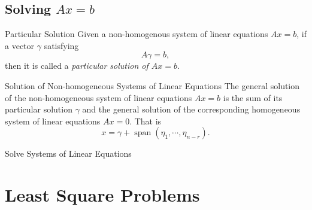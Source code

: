 \subsection{Solving $Ax = b$}

\begin{definition}{Particular Solution}{}
  Given a non-homogenous system of linear equations $Ax = b$,
  if a vector $\gamma$ satisfying 
  \begin{equation}
    A \gamma = b,
  \end{equation}
  then it is called a \emph{particular solution of $Ax = b$}.
\end{definition}

\begin{proposition}{Solution of Non-homogeneous Systems of Linear Equations}{}
  The general solution of the non-homogeneous system of linear equations $Ax = b$
  is the sum of its particular solution $\gamma$ and the general solution of
  the corresponding homogeneous system of linear equations $Ax = 0$.
  That is
  \begin{equation}
    x = \gamma + \operatorname{span} (\eta_1,\cdots,\eta_{n-r}).
  \end{equation}
\end{proposition}

\begin{example}{Solve Systems of Linear Equations}{}
  
\end{example}

\section{Least Square Problems}




